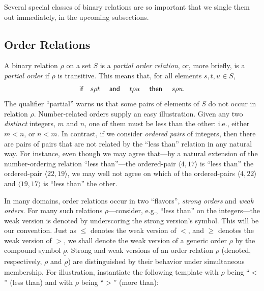 \bigskip

Several special classes of binary relations are so important that we single them out immediately, in the upcoming subsections.


\subsection{Order Relations}
\label{sec:order-relation}

   

A binary relation $\rho$ on a set $S$ is a {\it partial order relation}, or, more briefly, is a {\it partial order} if $\rho$ is transitive.  This means that, for all elements $s, t, u \in S$,
\begin{equation}
\label{eq:def-transitive}
\mbox{\sf if } \ \ s \rho t \ \ \ \mbox{\sf \ and } \ \ \ t \rho u \ \ \ \mbox{\sf \ then }
\ \ \ s \rho u.
\end{equation}
The qualifier ``partial'' warns us that some pairs of elements of $S$ do not occur in relation $\rho$.  Number-related orders supply an easy illustration.  Given any two {\em distinct} integers, $m$ and $n$, one of them must be less than the other: i.e., either $m < n$, or $n < m$.  In contrast, if we consider {\it ordered pairs} of integers, then there are pairs of pairs that are not related by the ``less than'' relation in any natural way.  For instance, even though we may agree that---by a natural extension of the number-ordering relation ``less than''---the ordered-pair $\langle 4, 17 \rangle$ is ``less than'' the ordered-pair $\langle 22, 19 \rangle$, we may well not agree on which of the ordered-pairs $\langle 4, 22 \rangle$ and $\langle 19, 17 \rangle$ is ``less than'' the other.

\medskip

In many domains, order relations occur in two ``flavors'', {\em strong orders} and {\em weak orders}.  For many such relations $\rho$---consider, e.g., ``less than'' on the integers---the weak version is denoted by underscoring the strong version's symbol.  This will be our convention.  Just as $\leq$ denotes the weak version of $<$, and $\geq$ denotes the weak version of $>$, we shall denote the weak version of a generic order $\rho$ by the compound symbol $\underline{\rho}$.  Strong and weak versions of an order relation $\rho$ (denoted, respectively, $\rho$ and $\underline{\rho}$) are distinguished by their behavior under simultaneous membership.  For illustration, instantiate the following template with $\rho$ being ``$<$'' (less than) and with $\rho$ being ``$>$'' (more than):

